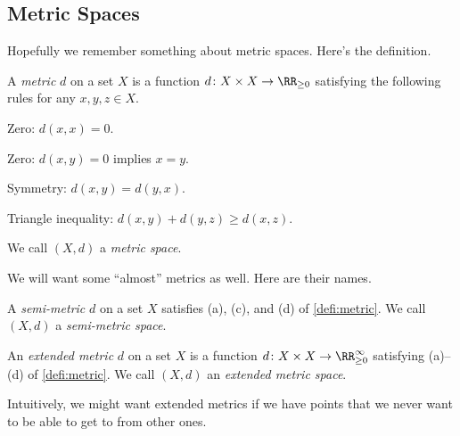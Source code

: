 \documentclass[../notes.tex]{subfiles}
\begin{document}
\subsection{Metric Spaces}
Hopefully we remember something about metric spaces. Here's the definition.
\begin{definition}[Metric] \label{defi:metric}
	A \textit{metric} $d$ on a set $X$ is a function $d\colon X\times X\to\RR_{\ge0}$ satisfying the following rules for any $x,y,z\in X$.
	\begin{listalph}
		\item Zero: $d(x,x)=0$.
		\item Zero: $d(x,y)=0$ implies $x=y$.
		\item Symmetry: $d(x,y)=d(y,x)$.
		\item Triangle inequality: $d(x,y)+d(y,z)\ge d(x,z)$.
	\end{listalph}
	We call $(X,d)$ a \textit{metric space}.
\end{definition}
We will want some ``almost'' metrics as well. Here are their names.
\begin{definition}
	A \textit{semi-metric} $d$ on a set $X$ satisfies (a), (c), and (d) of \autoref{defi:metric}. We call $(X,d)$ a \textit{semi-metric space}.
\end{definition}
\begin{definition}
	An \textit{extended metric} $d$ on a set $X$ is a function $d\colon X\times X\to\RR_{\ge0}^\infty$ satisfying (a)--(d) of \autoref{defi:metric}. We call $(X,d)$ an \textit{extended metric space}.
\end{definition}
Intuitively, we might want extended metrics if we have points that we never want to be able to get to from other ones.
\end{document}
